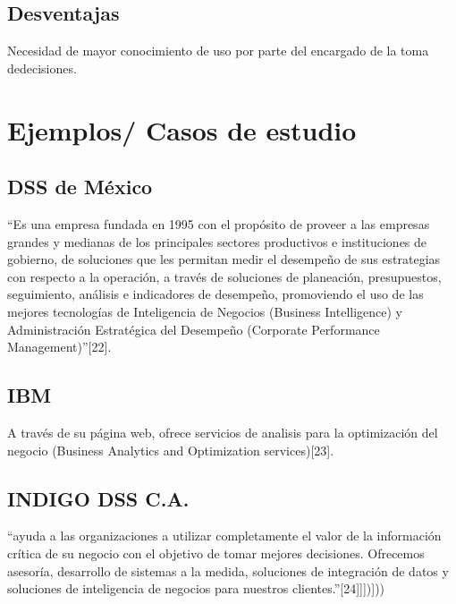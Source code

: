 \subsection{Desventajas}
\begin{description}
\item Necesidad de mayor conocimiento de uso por parte del encargado de la toma dedecisiones.
\end{description}

\section {Ejemplos/ Casos de estudio}
\subsection{DSS de México} “Es una empresa fundada en 1995 con el propósito de proveer a las empresas grandes y medianas de los principales sectores productivos e instituciones de gobierno, de soluciones que les permitan medir el desempeño de sus estrategias con respecto a la operación, a través de soluciones de planeación, presupuestos, seguimiento, análisis e indicadores de desempeño, promoviendo el uso de las mejores tecnologías de Inteligencia de Negocios (Business Intelligence) y Administración Estratégica del Desempeño (Corporate Performance Management)”[22].

\subsection{IBM} A través de su página web, ofrece servicios de analisis para la optimización del negocio (Business Analytics and Optimization services)[23].
\subsection{INDIGO DSS C.A.} “ayuda a las organizaciones a utilizar completamente el valor de la información crítica de su negocio con el objetivo de tomar mejores decisiones. Ofrecemos asesoría, desarrollo de sistemas a la medida, soluciones de integración de datos y soluciones de inteligencia de negocios para nuestros clientes.”[24]]])]))
